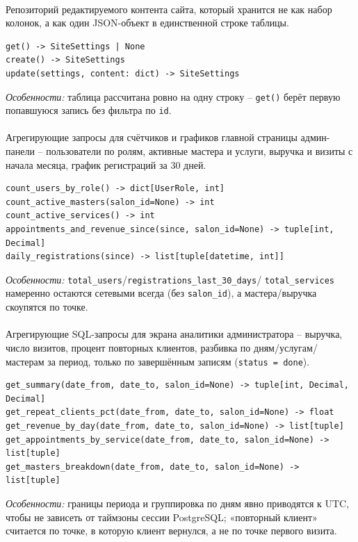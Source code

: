 \paragraph{}
Репозиторий редактируемого контента сайта, который хранится не как набор
колонок, а как один JSON-объект в единственной строке таблицы.
\begin{verbatim}
get() -> SiteSettings | None
create() -> SiteSettings
update(settings, content: dict) -> SiteSettings
\end{verbatim}
\textit{Особенности:} таблица рассчитана ровно на одну строку --
\texttt{get()} берёт первую попавшуюся запись без фильтра по \texttt{id}.

\paragraph{}
Агрегирующие запросы для счётчиков и графиков главной страницы
админ-панели -- пользователи по ролям, активные мастера и услуги,
выручка и визиты с начала месяца, график регистраций за 30 дней.
\begin{verbatim}
count_users_by_role() -> dict[UserRole, int]
count_active_masters(salon_id=None) -> int
count_active_services() -> int
appointments_and_revenue_since(since, salon_id=None) -> tuple[int, Decimal]
daily_registrations(since) -> list[tuple[datetime, int]]
\end{verbatim}
\textit{Особенности:} \texttt{total_users}/\texttt{registrations_last_30_days}/
\texttt{total_services} намеренно остаются сетевыми всегда (без
\texttt{salon_id}), а мастера/выручка скоупятся по точке.

\paragraph{}
Агрегирующие SQL-запросы для экрана аналитики администратора -- выручка,
число визитов, процент повторных клиентов, разбивка по
дням/услугам/мастерам за период, только по завершённым записям
(\texttt{status = done}).
\begin{verbatim}
get_summary(date_from, date_to, salon_id=None) -> tuple[int, Decimal, Decimal]
get_repeat_clients_pct(date_from, date_to, salon_id=None) -> float
get_revenue_by_day(date_from, date_to, salon_id=None) -> list[tuple]
get_appointments_by_service(date_from, date_to, salon_id=None) -> list[tuple]
get_masters_breakdown(date_from, date_to, salon_id=None) -> list[tuple]
\end{verbatim}
\textit{Особенности:} границы периода и группировка по дням явно
приводятся к UTC, чтобы не зависеть от таймзоны сессии PostgreSQL;
«повторный клиент» считается по точке, в которую клиент вернулся, а не
по точке первого визита.

